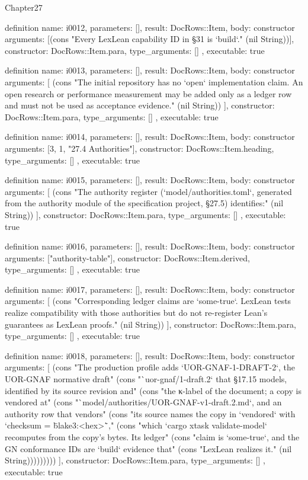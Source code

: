 \begin{lexlean}{Chapter27}
\begin{semanticmodule}
definition{
  name: i0012,
  parameters: [],
  result: DocRows::Item,
  body: constructor{
    arguments: [(cons "Every LexLean capability ID in §31 is `build`." (nil String))],
    constructor: DocRows::Item.para,
    type_arguments: []
  },
  executable: true
}

definition{
  name: i0013,
  parameters: [],
  result: DocRows::Item,
  body: constructor{
    arguments: [
      (cons "The initial repository has no `open` implementation claim. An open research or performance measurement may be added only as a ledger row and must not be used as acceptance evidence." (nil String))
    ],
    constructor: DocRows::Item.para,
    type_arguments: []
  },
  executable: true
}

definition{
  name: i0014,
  parameters: [],
  result: DocRows::Item,
  body: constructor{
    arguments: [3, 1, "27.4 Authorities"],
    constructor: DocRows::Item.heading,
    type_arguments: []
  },
  executable: true
}

definition{
  name: i0015,
  parameters: [],
  result: DocRows::Item,
  body: constructor{
    arguments: [
      (cons "The authority register (`model/authorities.toml`, generated from the authority module of the specification project, §27.5) identifies:" (nil String))
    ],
    constructor: DocRows::Item.para,
    type_arguments: []
  },
  executable: true
}

definition{
  name: i0016,
  parameters: [],
  result: DocRows::Item,
  body: constructor{
    arguments: ["authority-table"],
    constructor: DocRows::Item.derived,
    type_arguments: []
  },
  executable: true
}

definition{
  name: i0017,
  parameters: [],
  result: DocRows::Item,
  body: constructor{
    arguments: [
      (cons "Corresponding ledger claims are `some-true`. LexLean tests realize compatibility with those authorities but do not re-register Lean's guarantees as LexLean proofs." (nil String))
    ],
    constructor: DocRows::Item.para,
    type_arguments: []
  },
  executable: true
}

definition{
  name: i0018,
  parameters: [],
  result: DocRows::Item,
  body: constructor{
    arguments: [
      (cons "The production profile adds `UOR-GNAF-1-DRAFT-2`, the UOR-GNAF normative draft" (cons "`uor-gnaf/1-draft.2` that §17.15 models, identified by its source revision and" (cons "the κ-label of the document; a copy is vendored at" (cons "`model/authorities/UOR-GNAF-v1-draft.2.md`, and an authority row that vendors" (cons "its source names the copy in `vendored` with `checksum = \"blake3:<hex>\"`," (cons "which `cargo xtask validate-model` recomputes from the copy's bytes. Its ledger" (cons "claim is `some-true`, and the GN conformance IDs are `build` evidence that" (cons "LexLean realizes it." (nil String)))))))))
    ],
    constructor: DocRows::Item.para,
    type_arguments: []
  },
  executable: true
}


\end{semanticmodule}
\end{lexlean}
